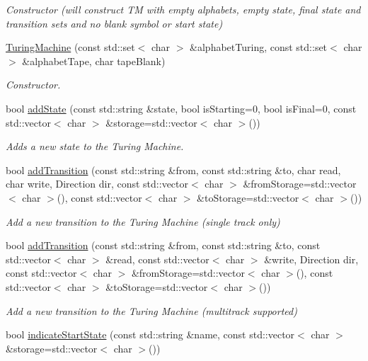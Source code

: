 \begin{DoxyCompactItemize}
\begin{DoxyCompactList}\small\item\em Constructor (will construct T\-M with empty alphabets, empty state, final state and transition sets and no blank symbol or start state) \end{DoxyCompactList}\item 
\hyperlink{class_turing_machine_a49e4703ebe100721f6e56cba53b355e3}{Turing\-Machine} (const std\-::set$<$ char $>$ \&alphabet\-Turing, const std\-::set$<$ char $>$ \&alphabet\-Tape, char tape\-Blank)
\begin{DoxyCompactList}\small\item\em Constructor. \end{DoxyCompactList}\item 
bool \hyperlink{class_turing_machine_aaf6b7e31d574ec07c65704c4f206bf3f}{add\-State} (const std\-::string \&state, bool is\-Starting=0, bool is\-Final=0, const std\-::vector$<$ char $>$ \&storage=std\-::vector$<$ char $>$())
\begin{DoxyCompactList}\small\item\em Adds a new state to the Turing Machine. \end{DoxyCompactList}\item 
bool \hyperlink{class_turing_machine_a258cb0a81d4b6ef4d5b57360b57e81a1}{add\-Transition} (const std\-::string \&from, const std\-::string \&to, char read, char write, Direction dir, const std\-::vector$<$ char $>$ \&from\-Storage=std\-::vector$<$ char $>$(), const std\-::vector$<$ char $>$ \&to\-Storage=std\-::vector$<$ char $>$())
\begin{DoxyCompactList}\small\item\em Add a new transition to the Turing Machine (single track only) \end{DoxyCompactList}\item 
bool \hyperlink{class_turing_machine_ac0ca3600716d97f2b8eedff27b9d23b2}{add\-Transition} (const std\-::string \&from, const std\-::string \&to, const std\-::vector$<$ char $>$ \&read, const std\-::vector$<$ char $>$ \&write, Direction dir, const std\-::vector$<$ char $>$ \&from\-Storage=std\-::vector$<$ char $>$(), const std\-::vector$<$ char $>$ \&to\-Storage=std\-::vector$<$ char $>$())
\begin{DoxyCompactList}\small\item\em Add a new transition to the Turing Machine (multitrack supported) \end{DoxyCompactList}\item 
bool \hyperlink{class_turing_machine_a6552f37d23636f3ec9697b6a9bf21951}{indicate\-Start\-State} (const std\-::string \&name, const std\-::vector$<$ char $>$ \&storage=std\-::vector$<$ char $>$())

\end{DoxyCompactItemize}
